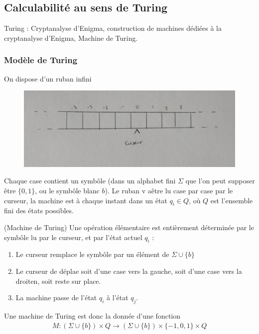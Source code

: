         \subsection{Calculabilité au sens de Turing}
            Turing : Cryptanalyse d'Enigma, construction de machines dédiées à la cryptanalyse d'Enigma, Machine de Turing.
            
            \subsubsection{Modèle de Turing}
                On dispose d'un ruban infini
                \begin{figure}[H]
                    \centering
                    \includegraphics[width=.5\textwidth]{pictures/01}
                \end{figure}
                Chaque case contient un symbôle (dans un alphabet fini $\Sigma$ que l'on peut supposer être $\{0, 1\}$, ou le symbôle blanc $b$). Le ruban v aêtre lu case par case par le curseur, la machine est à chaque instant dans un état $q_i \in Q$, où $Q$ est l'ensemble fini des états possibles.
                \begin{defi} (Machine de Turing)
                    Une opération élémentaire est entièrement déterminée par le symbôle lu par le curseur, et par l'état actuel $q_i$ :
                    \begin{enumerate}
                        \item Le curseur remplace le symbôle par un élément de $\Sigma \cup \{b\}$
                        \item Le curseur de déplae soit d'une case vers la gauche, soit d'une case vers la droiten, soit reste sur place.
                        \item La machine passe de l'état $q_i$ à l'état $q_j$.
                    \end{enumerate}
                    Une machine de Turing est donc la donnée d'une fonction
                    \begin{align*}
                        M : (\Sigma \cup \{b\}) \times Q \to (\Sigma \cup \{b\}) \times \{-1, 0, 1\} \times Q
                    \end{align*}
                \end{defi}
